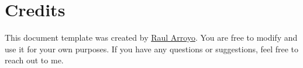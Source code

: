 \documentclass{article}
\begin{document}
\begin{center}
    {\fontsize{36}{36}\selectfont\interheavy \fullName} \\ \bigskip 
    {\fontsize{18}{18}\selectfont\interthin \grade} \\ \bigskip 
    \hfill {\location} \\
    \hfill \href{mailto:\email}{\email} \\
    \hfill \href{https://github.com/\ghUserName}{\MakeLowercase{\ghUserName}} \\ 
    \hfill \href{https://www.linkedin.com/in/\linkedinUser}{\linkedinUser} 
\end{center}






\section*{Credits}
This document template was created by \href{https://www.linkedin.com/in/raul-ae}{Raul Arroyo}. You are free to modify and use it for your own purposes. If you have any questions or suggestions, feel free to reach out to me.
\end{document}
